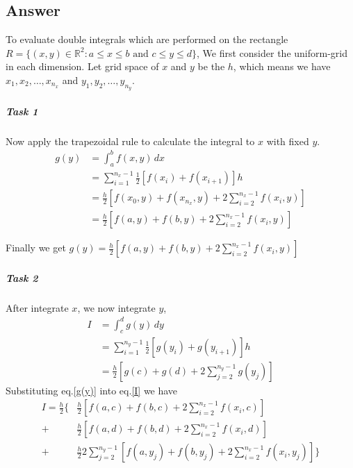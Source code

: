 \documentclass[
	12pt, %
]{fphw}
\numberwithin{equation}{section}
\numberwithin{figure}{section}
\numberwithin{table}{section}
\begin{document}
\subsection*{Answer}

To evaluate double integrals which are performed on the rectangle $R = \{ (x, y) \in \mathbb{R}^2: a \leq x \leq b \text{ and } c \leq y \leq d  \} $, We first consider the uniform-grid in each
dimension. Let grid space of $x$ and $y$ be the $h$, which means we have $x_1, x_2, \ldots , x_{n_x}$ and $y_1, y_2, \ldots , y_{n_y}$.\cite{numinteg}

\subparagraph*{Task 1}
Now apply the trapezoidal rule to calculate the integral to $x$ with fixed $y$.
\begin{equation} \label{g(y)}
	\begin{aligned}
		g(y) & = \int^{b}_{a}f(x,y)\,dx                                                 \\
		     & = \sum^{n_x-1}_{i=1}\frac{1}{2}[f(x_i)+f(x_{i+1})]h                      \\
		     & = \frac{h}{2} [f(x_0, y) + f(x_{n_x}, y) + 2\sum^{n_x-1}_{i=2}f(x_i, y)] \\
		     & = \frac{h}{2} [f(a, y) + f(b, y) + 2\sum^{n_x-1}_{i=2}f(x_i, y)]
	\end{aligned}
\end{equation}

Finally we get $g(y)=\frac{h}{2} [f(a, y) + f(b, y) + 2\sum^{n_x-1}_{i=2}f(x_i, y)]$

\subparagraph*{Task 2}
After integrate $x$, we now integrate $y$,
\begin{equation} \label{I}
	\begin{aligned}
		I & = \int^{d}_{c}g(y)\,dy                                  \\
		  & = \sum^{n_y-1}_{i=1}\frac{1}{2} [g(y_i)+g(y_{i+1})]h    \\
		  & = \frac{h}{2} [g(c) + g(d) + 2\sum^{n_y-1}_{j=2}g(y_j)]
	\end{aligned}
\end{equation}
Substituting eq.\eqref{g(y)} into  eq.\eqref{I} we have
\begin{equation}
	\begin{aligned} \label{substitutedI}
		I = \frac{h}{2}\{ & \frac{h}{2}[f(a, c) + f(b, c) + 2\sum^{n_x-1}_{i=2}f(x_i, c)]                            \\
		+                 & \frac{h}{2}[f(a, d) + f(b, d) + 2\sum^{n_x-1}_{i=2}f(x_i, d)]                            \\
		+                 & \frac{h}{2}2\sum^{n_y-1}_{j=2}[f(a, y_j) + f(b, y_j) + 2\sum^{n_x-1}_{i=2}f(x_i, y_j)]\}
	\end{aligned}
\end{equation}
\end{document}
